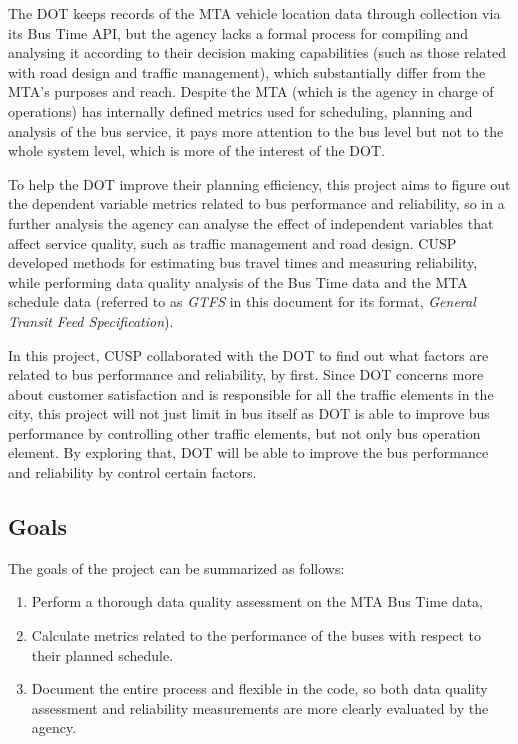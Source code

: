 \documentclass[12pt]{report}
\begin{document}
The DOT keeps records of the MTA vehicle location data through collection via its Bus Time API, but the agency lacks a formal process for compiling and analysing it according to their decision making capabilities (such as those related with road design and traffic management), which substantially differ from the MTA's purposes and reach. Despite the MTA (which is the agency in charge of operations) has internally defined metrics used for scheduling, planning and analysis of the bus service, it pays more attention to the bus level but not to the whole system level, which is more of the interest of the DOT.
 
To help the DOT improve their planning efficiency, this project aims to figure out the dependent variable metrics related to bus performance and reliability, so in a further analysis the agency can analyse the effect of independent variables that affect service quality, such as traffic management and road design. CUSP developed methods for estimating bus travel times and measuring reliability, while performing data quality analysis of the Bus Time data and the MTA schedule data (referred to as \textit{GTFS} in this document for its format, \textit{General Transit Feed Specification}). 

In this project, CUSP collaborated with the DOT to find out what factors are related to bus performance and reliability, by first. Since DOT concerns more about customer satisfaction and is responsible for all the traffic elements in the city, this project will not just limit in bus itself as DOT is able to improve bus performance by controlling other traffic elements, but not only bus operation element. By exploring that, DOT will be able to improve the bus performance and reliability by control certain factors.


\subsection{Goals}

The goals of the project can be summarized as follows:

\begin{enumerate}
\item Perform a thorough data quality assessment on the MTA Bus Time data, 

\item Calculate metrics related to the performance of the buses with respect to their planned schedule.

\item Document the entire process and flexible in the code, so both data quality assessment and reliability measurements are more clearly evaluated by the agency.
\end{enumerate}
\end{document}
